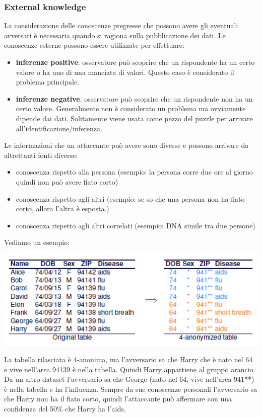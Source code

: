 \subsubsection{External knowledge}
La considerazione delle conoscenze pregresse che possono avere gli eventuali avversari è necessaria quando si ragiona sulla pubblicazione dei dati. Le conoscenze esterne possono essere utilizzate per effettuare:
\begin{itemize}
    \item \textbf{inferenze positive}: osservatore può scoprire che un rispondente ha un certo valore o ha uno di una manciata di valori. Questo caso è considerato il problema principale.
    \item \textbf{inferenze negative}: osservatore può scoprire che un rispondente non ha un certo valore. Generalmente non è considerato un problema ma ovviamente dipende dai dati. Solitamente viene usata come pezzo del puzzle per arrivare all’identificazione/inferenza.
\end{itemize}
Le informazioni che un attaccante può avere sono diverse e possono arrivare da altrettanti fonti diverse:
\begin{itemize}
    \item conoscenza rispetto alla persona (esempio: la persona corre due ore al giorno quindi non può avere fiato corto)
    \item conoscenza rispetto agli altri (esempio: se so che una persona non ha fiato corto, allora l’altra è esposta.)
    \item conoscenza rispetto agli altri correlati (esempio: DNA simile tra due persone)
\end{itemize}
Vediamo un esempio:
\begin{center}
    \includegraphics[scale=0.6]{img/exknow.png}
\end{center}
La tabella rilasciata è 4-anonima, ma l'avversario sa che Harry che è nato nel 64 e vive nell'area 94139 è nella tabella. Quindi Harry appartiene al gruppo arancio. Da un altro dataset l'avversario sa che George (nato nel 64, vive nell'area 941**) è nella tabella e ha l'influenza. Sempre da sue conoscenze personali l'avversario sa che Harry non ha il fiato corto, quindi l'attaccante può affermare con una confidenza del 50\% che Harry ha l'aids.

